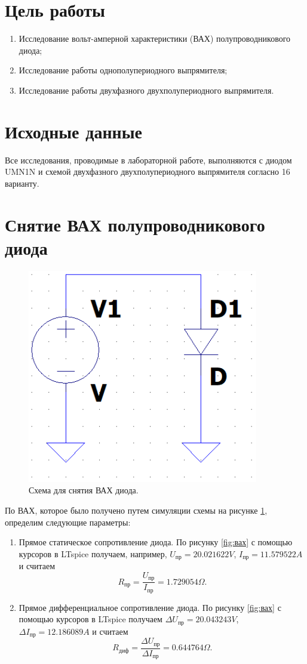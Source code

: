 \section*{Цель работы}

\begin{enumerate}
    \item Исследование вольт-амперной характеристики (ВАХ) полупроводникового диода;
    \item Исследование работы однополупериодного выпрямителя;
    \item Исследование работы двухфазного двухполупериодного выпрямителя.
\end{enumerate}



\section*{Исходные данные}

Все исследования, проводимые в лабораторной работе, выполняются с диодом UMN1N 
и схемой двухфазного двухполупериодного выпрямителя согласно 16 варианту.



\section*{Снятие ВАХ полупроводникового диода}

\begin{figure}[htbp]
    \centering
    \includegraphics[width=0.3\linewidth]{figs/схема_иссл_вах.png}
    \caption{Схема для снятия ВАХ диода.}
    \label{fig:схемаисслвах}
\end{figure}

По ВАХ, которое было получено путем симуляции схемы на рисунке \ref{fig:схемаисслвах}, 
определим следующие параметры:
\begin{enumerate}
    \item Прямое статическое сопротивление диода.
    По рисунку \ref{fig:вах} с помощью курсоров в LTspice получаем, например, $U_\text{пр}=20.021622V$, $I_{\text{пр}}=11.579522A$
    и считаем
    $$
    R_\text{пр}=\frac{U_\text{пр}}{I_{\text{пр}}}=1.729054\Omega.
    $$
    \item Прямое дифференциальное сопротивление диода.
    По рисунку \ref{fig:вах} с помощью курсоров в LTspice получаем $\Delta U_\text{пр}=20.043243V$, $\Delta I_{\text{пр}}=12.186089A$
    и считаем
    $$
    R_\text{диф}=\frac{\Delta U_\text{пр}}{\Delta I_{\text{пр}}}=0.644764\Omega.
    $$
\end{enumerate}

